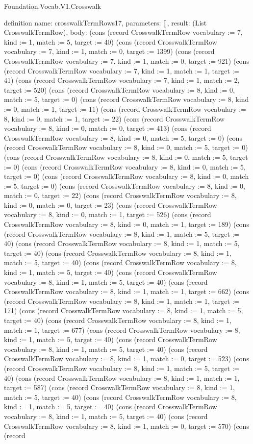 \begin{lexlean}{Foundation.Vocab.V1.Crosswalk}
\begin{semanticmodule}
definition{
  name: crosswalkTermRows17,
  parameters: [],
  result: (List CrosswalkTermRow),
  body: (cons (record CrosswalkTermRow {vocabulary := 7, kind := 1, match := 5, target := 40}) (cons (record CrosswalkTermRow {vocabulary := 7, kind := 1, match := 0, target := 1399}) (cons (record CrosswalkTermRow {vocabulary := 7, kind := 1, match := 0, target := 921}) (cons (record CrosswalkTermRow {vocabulary := 7, kind := 1, match := 1, target := 41}) (cons (record CrosswalkTermRow {vocabulary := 7, kind := 1, match := 2, target := 520}) (cons (record CrosswalkTermRow {vocabulary := 8, kind := 0, match := 5, target := 0}) (cons (record CrosswalkTermRow {vocabulary := 8, kind := 0, match := 1, target := 11}) (cons (record CrosswalkTermRow {vocabulary := 8, kind := 0, match := 1, target := 22}) (cons (record CrosswalkTermRow {vocabulary := 8, kind := 0, match := 0, target := 413}) (cons (record CrosswalkTermRow {vocabulary := 8, kind := 0, match := 5, target := 0}) (cons (record CrosswalkTermRow {vocabulary := 8, kind := 0, match := 5, target := 0}) (cons (record CrosswalkTermRow {vocabulary := 8, kind := 0, match := 5, target := 0}) (cons (record CrosswalkTermRow {vocabulary := 8, kind := 0, match := 5, target := 0}) (cons (record CrosswalkTermRow {vocabulary := 8, kind := 0, match := 5, target := 0}) (cons (record CrosswalkTermRow {vocabulary := 8, kind := 0, match := 0, target := 22}) (cons (record CrosswalkTermRow {vocabulary := 8, kind := 0, match := 0, target := 23}) (cons (record CrosswalkTermRow {vocabulary := 8, kind := 0, match := 1, target := 526}) (cons (record CrosswalkTermRow {vocabulary := 8, kind := 0, match := 1, target := 189}) (cons (record CrosswalkTermRow {vocabulary := 8, kind := 1, match := 5, target := 40}) (cons (record CrosswalkTermRow {vocabulary := 8, kind := 1, match := 5, target := 40}) (cons (record CrosswalkTermRow {vocabulary := 8, kind := 1, match := 5, target := 40}) (cons (record CrosswalkTermRow {vocabulary := 8, kind := 1, match := 5, target := 40}) (cons (record CrosswalkTermRow {vocabulary := 8, kind := 1, match := 5, target := 40}) (cons (record CrosswalkTermRow {vocabulary := 8, kind := 1, match := 1, target := 662}) (cons (record CrosswalkTermRow {vocabulary := 8, kind := 1, match := 1, target := 171}) (cons (record CrosswalkTermRow {vocabulary := 8, kind := 1, match := 5, target := 40}) (cons (record CrosswalkTermRow {vocabulary := 8, kind := 1, match := 1, target := 677}) (cons (record CrosswalkTermRow {vocabulary := 8, kind := 1, match := 5, target := 40}) (cons (record CrosswalkTermRow {vocabulary := 8, kind := 1, match := 5, target := 40}) (cons (record CrosswalkTermRow {vocabulary := 8, kind := 1, match := 0, target := 523}) (cons (record CrosswalkTermRow {vocabulary := 8, kind := 1, match := 5, target := 40}) (cons (record CrosswalkTermRow {vocabulary := 8, kind := 1, match := 1, target := 587}) (cons (record CrosswalkTermRow {vocabulary := 8, kind := 1, match := 5, target := 40}) (cons (record CrosswalkTermRow {vocabulary := 8, kind := 1, match := 5, target := 40}) (cons (record CrosswalkTermRow {vocabulary := 8, kind := 1, match := 5, target := 40}) (cons (record CrosswalkTermRow {vocabulary := 8, kind := 1, match := 0, target := 570}) (cons (record }
\end{semanticmodule}
\end{lexlean}
